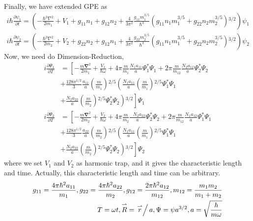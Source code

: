 Finally, we have extended GPE as
\begin{equation}
\begin{split}
i \hbar \frac{\partial \psi _1}{\partial t}=\left(-\frac{\hbar ^2\nabla ^2}{2m_1}+V_1+g_{11}n_1+g_{12}n_2+\frac{4}{3\pi ^2}\frac{g_{11}m_1^{3/5}}{\hbar
^3}\left(g_{11}n_1m_1^{3/5}+g_{22}n_2m_2^{3/5}\right){}^{3/2}\right)\psi _1\\
i \hbar \frac{\partial \psi _2}{\partial t}=\left(-\frac{\hbar ^2\nabla ^2}{2m_2}+V_2+g_{22}n_2+g_{12}n_1+\frac{4}{3\pi ^2}\frac{g_{22}m_2^{3/5}}{\hbar
^3}\left(g_{11}n_1m_1^{3/5}+g_{22}n_2m_2^{3/5}\right){}^{3/2}\right)\psi _2
\end{split}
\end{equation}
Now, we need do Dimension-Reduction, 
\begin{equation}
\begin{split}
i \frac{\partial \Psi _1}{\partial T}&=\left[-\frac{m\pmb{\nabla }^2}{2m_1}+\frac{V_1}{\hbar  \omega }+4\pi  \frac{m}{m_1}\frac{ N_1a_{11}}{a}\Psi_1^*\Psi _1+2\pi \frac{ m }{m_{12}}\frac{N_2a_{12}}{a}\Psi _2^*\Psi _2\right.\\
&\left.+\frac{128\pi ^{1/2} }{3} \frac{a_{11}}{a}\left(\frac{m}{m_1}\right){}^{2/5}\left(\frac{N_1a_{11}}{a}\left(\frac{m}{m_1}\right){}^{2/5}\Psi _1^*\Psi _1\right.\right.\\
&\left.\left.+ \frac{N_2a_{22}}{a}\left(\frac{m}{m_2}\right){}^{2/5}\Psi _2^*\Psi _2\right){}^{3/2}\right]\Psi_1\\
i \frac{\partial \Psi _2}{\partial T}&=\left[-\frac{m\pmb{\nabla }^2}{2m_2}+\frac{V_2}{\hbar  \omega }+4\pi  \frac{m}{m_2}\frac{\text{  }N_2a_{22}}{a}\Psi_2^*\Psi _2+2\pi \frac{ m }{m_{12}}\frac{N_1a_{12}}{a}\Psi _1^*\Psi _1\right.\\
&\left.+\frac{128\pi ^{1/2} }{3}\frac{a_{22}}{a}\left(\frac{m}{m_2}\right){}^{2/5}\left(\frac{N_1a_{11}}{a}\left(\frac{m}{m_1}\right){}^{2/5}\Psi _1^*\Psi _1\right.\right.\\
&\left.\left.+ \frac{N_2a_{22}}{a}\left(\frac{m}{m_2}\right){}^{2/5}\Psi _2^*\Psi _2\right){}^{3/2}\right]\Psi_2
\end{split}
\end{equation}
where we set $V_1$ and $V_2$ as harmonic trap, and it gives the characteristic length and time. Actually, this characteristic length and time can be arbitrary.
\begin{equation}
\begin{split}
g_{11}=\frac{4\pi  \hbar ^2a_{11}}{m_1}, g_{22}=\frac{4\pi  \hbar ^2a_{22}}{m_2}, g_{12}=\frac{2\pi  \hbar ^2a_{12}}{m_{12}}, m_{12}=\frac{m_1m_2}{m_1+m_2}\\
T=\omega  t, \overset{\rightharpoonup }{R}=\left.\overset{\rightharpoonup }{r}\right/a, \Psi =\psi  a^{3/2}, a=\sqrt{\frac{\hbar }{m \omega }}
\end{split}
\end{equation}
